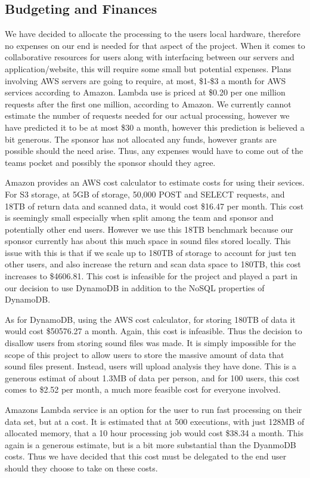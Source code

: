 \subsection{Budgeting and Finances}
We have decided to allocate the processing to the user\textquotesingle s local hardware, therefore no expenses on our end is needed for that aspect of the project. When it comes to collaborative resources for users along with interfacing between our servers and application/website, this will require some small but potential expenses. Plans involving AWS servers are going to require, at most, \$1-\$3 a month for AWS services according to Amazon. Lambda use is priced at \$0.20 per one million requests after the first one million, according to Amazon. We currently cannot estimate the number of requests needed for our actual processing, however we have predicted it to be at most \$30 a month, however this prediction is believed a bit generous. The sponsor has not allocated any funds, however grants are possible should the need arise. Thus, any expenses would have to come out of the team\textquotesingle s pocket and possibly the sponsor should they agree.\par
Amazon provides an AWS cost calculator to estimate costs for using their sevices. For S3 storage, at 5GB of storage, 50,000 POST and SELECT requests, and 18TB of return data and scanned data, it would cost \$16.47 per month. This cost is seemingly small especially when split among the team and sponsor and potentially other end users. However we use this 18TB benchmark because our sponsor currently has about this much space in sound files stored locally. This issue with this is that if we scale up to 180TB of storage to account for just ten other users, and also increase the return and scan data space to 180TB, this cost increases to \$4606.81. This cost is infeasible for the project and played a part in our decision to use DynamoDB in addition to the NoSQL properties of DynamoDB.\par
As for DynamoDB, using the AWS cost calculator, for storing 180TB of data it would cost \$50576.27 a month. Again, this cost is infeasible. Thus the decision to disallow users from storing sound files was made. It is simply impossible for the scope of this project to allow users to store the massive amount of data that sound files present. Instead, users will upload analysis they have done. This is a generous estimat of about 1.3MB of data per person, and for 100 users, this cost comes to \$2.52 per month, a much more feasible cost for everyone involved.\par
Amazon\textquotesingle s Lambda service is an option for the user to run fast processing on their data set, but at a cost. It is estimated that at 500 executions, with just 128MB of allocated memory, that a 10 hour processing job would cost \$38.34 a month. This again is a generous estimate, but is a bit more substantial than the DyanmoDB costs. Thus we have decided that this cost must be delegated to the end user should they choose to take on these costs.
